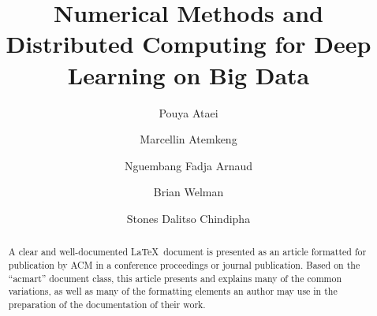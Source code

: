 \documentclass[acmsmall]{acmart}
\begin{document}

\title{Numerical Methods and Distributed Computing for Deep Learning on Big Data}

\author{Pouya Ataei}

\author{Marcellin Atemkeng}

\author{Nguembang Fadja Arnaud}

\author{Brian Welman}

\author{Stones Dalitso Chindipha}

\renewcommand{\shortauthors}{Trovato et al.}

\begin{abstract}
    A clear and well-documented \LaTeX\ document is presented as an
    article formatted for publication by ACM in a conference proceedings
    or journal publication. Based on the ``acmart'' document class, this
    article presents and explains many of the common variations, as well
    as many of the formatting elements an author may use in the
    preparation of the documentation of their work.
\end{abstract}
\end{document}
